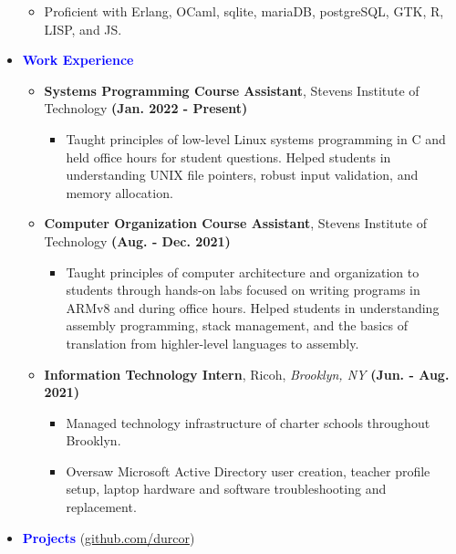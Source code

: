 \documentclass[11pt]{article}
\begin{document}
\begin{flushleft}
\begin{itemize}
\begin{itemize}
            \item Proficient with Erlang, OCaml, sqlite, mariaDB, postgreSQL, GTK, R, LISP, and JS.
        \end{itemize}
        \item[] \Large \textcolor{blue}{\textbf{Work Experience}} \normalsize
            \begin{itemize}
                \item \textbf{Systems Programming Course Assistant}, Stevens Institute of Technology \hfill{\textbf{(Jan. 2022 - Present)}}
                    \begin{itemize}
                        \item Taught principles of low-level Linux systems programming in C and held office hours for student questions. Helped students in understanding UNIX file pointers, robust input validation, and memory allocation.
                    \end{itemize}
                \item \textbf{Computer Organization Course Assistant}, Stevens Institute of Technology \hfill{\textbf{(Aug. - Dec. 2021)}}
                    \begin{itemize}
                        \item Taught principles of computer architecture and organization to students through hands-on labs focused on writing programs in ARMv8 and during office hours. Helped students in understanding assembly programming, stack management, and the basics of translation from highler-level languages to assembly.
                    \end{itemize}
                \item \textbf{Information Technology Intern}, Ricoh, \textit{Brooklyn, NY} \hfill{\textbf{(Jun. - Aug. 2021)}}
                    \begin{itemize}
                        \item Managed technology infrastructure of charter schools throughout Brooklyn.
						\item Oversaw Microsoft Active Directory user creation, teacher profile setup, laptop hardware and software troubleshooting and replacement.
                    \end{itemize}
            \end{itemize}
    \item[] \Large \textcolor{blue}{\textbf{Projects}} (\url{github.com/durcor}) \normalsize
        \begin{itemize}

\end{itemize}
\end{itemize}
\end{flushleft}
\end{document}
